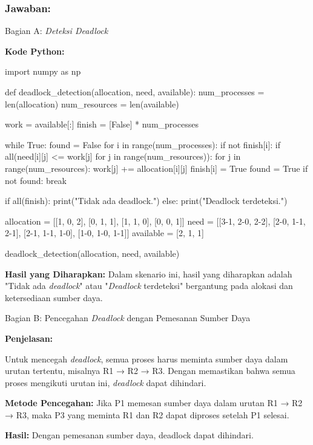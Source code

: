 \documentclass[12pt]{article}
\begin{document}
\subsubsection{Jawaban:}

Bagian A: \textit{Deteksi Deadlock}

\textbf{Kode Python:}

\begin{python}
import numpy as np

def deadlock_detection(allocation, need, available):
    num_processes = len(allocation)
    num_resources = len(available)
    
    work = available[:]
    finish = [False] * num_processes
    
    while True:
        found = False
        for i in range(num_processes):
            if not finish[i]:
                if all(need[i][j] <= work[j] for j in range(num_resources)):
                    for j in range(num_resources):
                        work[j] += allocation[i][j]
                    finish[i] = True
                    found = True
        if not found:
            break
    
    if all(finish):
        print("Tidak ada deadlock.")
    else:
        print("Deadlock terdeteksi.")

allocation = [[1, 0, 2], [0, 1, 1], [1, 1, 0], [0, 0, 1]]
need = [[3-1, 2-0, 2-2], [2-0, 1-1, 2-1], [2-1, 1-1, 1-0], [1-0, 1-0, 1-1]]
available = [2, 1, 1]

deadlock_detection(allocation, need, available)
\end{python}

\textbf{Hasil yang Diharapkan:} Dalam skenario ini, hasil yang diharapkan adalah "Tidak ada \textit{deadlock}" atau "\textit{Deadlock} terdeteksi" bergantung pada alokasi dan ketersediaan sumber daya.

Bagian B: Pencegahan \textit{Deadlock} dengan Pemesanan Sumber Daya

\textbf{Penjelasan:}

Untuk mencegah \textit{deadlock}, semua proses harus meminta sumber daya dalam urutan tertentu, misalnya R1 → R2 → R3. Dengan memastikan bahwa semua proses mengikuti urutan ini, \textit{deadlock} dapat dihindari.

\textbf{Metode Pencegahan:}
Jika P1 memesan sumber daya dalam urutan R1 → R2 → R3, maka P3 yang meminta R1 dan R2 dapat diproses setelah P1 selesai.

\textbf{Hasil:}
Dengan pemesanan sumber daya, deadlock dapat dihindari.
\end{document}
